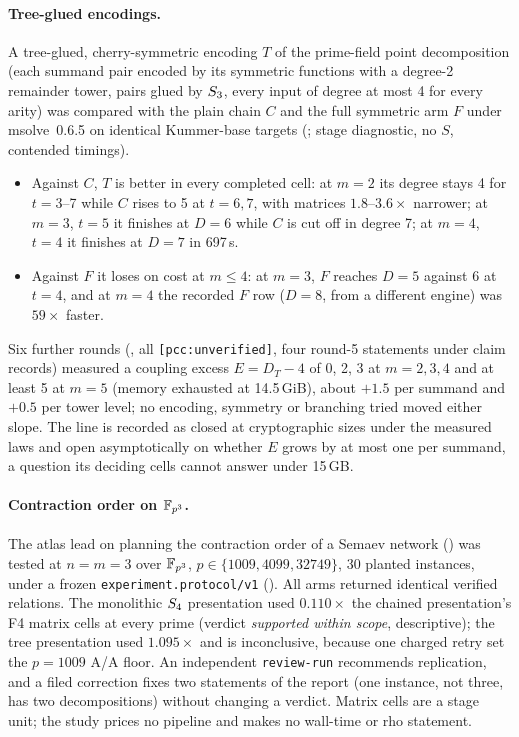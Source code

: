 \paragraph{Tree-glued encodings.} A tree-glued, cherry-symmetric encoding
$T$ of the prime-field point decomposition (each summand pair encoded by its
symmetric functions with a degree-2 remainder tower, pairs glued by
$S_{3}$, every input of degree at most 4 for every arity) was compared with
the plain chain $C$ and the full symmetric arm $F$ under msolve~0.6.5 on
identical Kummer-base targets (;
stage diagnostic, no $S$, contended timings).
\begin{itemize}
\item Against $C$, $T$ is better in every completed cell: at $m=2$ its
  degree stays 4 for $t=3$--7 while $C$ rises to 5 at $t=6,7$, with matrices
  $1.8$--$3.6\times$ narrower; at $m=3$, $t=5$ it finishes at $D=6$ while $C$
  is cut off in degree 7; at $m=4$, $t=4$ it finishes at $D=7$ in 697\,s.
\item Against $F$ it loses on cost at $m\le4$: at $m=3$, $F$ reaches $D=5$
  against 6 at $t=4$, and at $m=4$ the recorded $F$ row ($D=8$, from a different
  engine) was $59\times$ faster.
\end{itemize}
Six further rounds (, all
\texttt{[pcc:unverified]}, four round-5 statements under claim records)
measured a coupling excess $E=D_T-4$ of 0, 2, 3 at $m=2,3,4$ and at least 5
at $m=5$ (memory exhausted at 14.5\,GiB), about $+1.5$ per summand and $+0.5$
per tower level; no encoding, symmetry or branching tried moved either slope.
The line is recorded as closed at cryptographic sizes under the measured laws
and open asymptotically on whether $E$ grows by at most one per summand, a
question its deciding cells cannot answer under 15\,GB.

\paragraph{Contraction order on $\mathbb{F}_{p^3}$.} The atlas lead on planning the
contraction order of a Semaev network
()
was tested at $n=m=3$ over $\mathbb{F}_{p^3}$, $p\in\{1009,4099,32749\}$, 30 planted
instances, under a frozen \texttt{experiment.protocol/v1}
().
All arms returned identical verified relations. The monolithic $S_{4}$
presentation used $0.110\times$ the chained presentation's F4 matrix cells at
every prime (verdict \emph{supported within scope}, descriptive); the tree
presentation used $1.095\times$ and is inconclusive, because one charged
retry set the $p=1009$ A/A floor. An independent \texttt{review-run}
recommends replication, and a filed correction fixes two statements of the
report (one instance, not three, has two decompositions) without changing a
verdict. Matrix cells are a stage unit; the study prices no pipeline and
makes no wall-time or rho statement.

